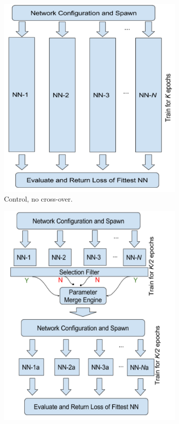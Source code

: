 \begin{figure}[h!]
\begin{subfigure}[h]{0.49\linewidth}
\includegraphics[width=\linewidth]{figures/simple.png}
\caption{Control, no cross-over.}
\end{subfigure}
\hfill
\begin{subfigure}[h]{0.49\linewidth}
\includegraphics[width=\linewidth]{figures/workflow.png}

\end{subfigure}
\end{figure}
